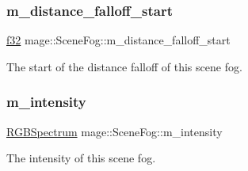 \subsubsection{\texorpdfstring{m\+\_\+distance\+\_\+falloff\+\_\+start}{m\_distance\_falloff\_start}}
{\footnotesize\ttfamily \hyperlink{namespacemage_a6a44ad388483959dc4dff9f2aef91431}{f32} mage\+::\+Scene\+Fog\+::m\+\_\+distance\+\_\+falloff\+\_\+start\hspace{0.3cm}{\ttfamily [private]}}

The start of the distance falloff of this scene fog. \hypertarget{structmage_1_1_scene_fog_ad3758984c5a1941cd883dd82f8ebe975}{}\label{structmage_1_1_scene_fog_ad3758984c5a1941cd883dd82f8ebe975} 
\subsubsection{\texorpdfstring{m\+\_\+intensity}{m\_intensity}}
{\footnotesize\ttfamily \hyperlink{structmage_1_1_r_g_b_spectrum}{R\+G\+B\+Spectrum} mage\+::\+Scene\+Fog\+::m\+\_\+intensity\hspace{0.3cm}{\ttfamily [private]}}

The intensity of this scene fog. 